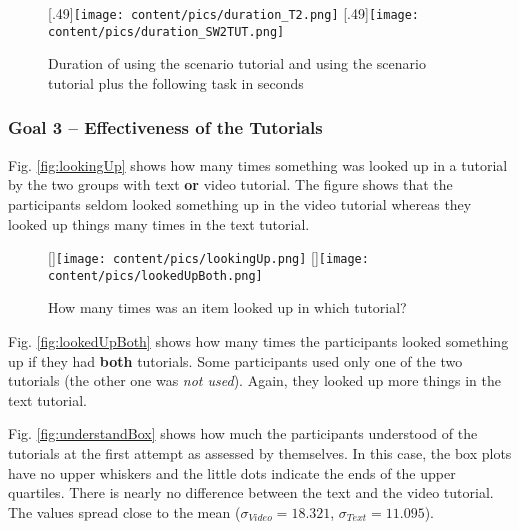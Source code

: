  \begin{figure}
 	\centering
 	[.49\linewidth]{\texttt{[image: content/pics/duration\_T2.png]}}
 	[.49\linewidth]{\texttt{[image: content/pics/duration\_SW2TUT.png]}}
 	\caption{Duration of using the scenario tutorial and using the scenario tutorial plus the following task in seconds}
 \end{figure}


\subsubsection{Goal 3 -- Effectiveness of the Tutorials}

Fig. \ref{fig:lookingUp} shows how many times something was looked up in a tutorial by the two groups with text \textbf{or} video tutorial. The figure shows that the participants seldom looked something up in the video tutorial whereas they looked up things many times in the text tutorial. 
\begin{figure}
	\centering
	[\linewidth]{\texttt{[image: content/pics/lookingUp.png]}}
	[\linewidth]{\texttt{[image: content/pics/lookedUpBoth.png]}}
	\caption{How many times was an item looked up in which tutorial?}
\end{figure}


Fig. \ref{fig:lookedUpBoth} shows how many times the participants looked something up if they had \textbf{both} tutorials. Some participants used only one of the two tutorials (the other one was \textit{not used}). Again, they looked up more things in the text tutorial. 


Fig. \ref{fig:understandBox} shows how much the participants understood of the tutorials at the first attempt as assessed by themselves. In this case, the box plots have no upper whiskers and the little dots indicate the ends of the upper quartiles. There is nearly no difference between the text and the video tutorial. The values spread close to the mean ($\sigma_{\mathit{Video}}=18.321$, $\sigma_{\mathit{Text}}= 11.095$). 


